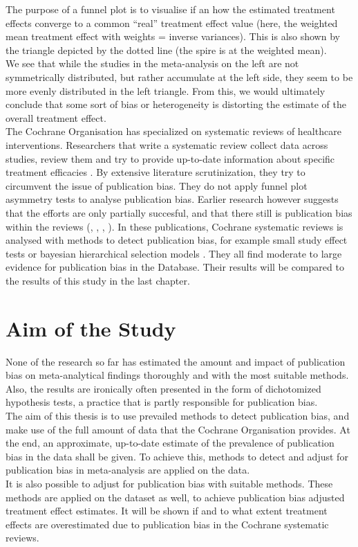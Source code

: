 \documentclass[11pt,a4paper,twoside]{book}\usepackage[]{graphicx}\usepackage[]{color}
\begin{document}
The purpose of a funnel plot is to visualise if an how the estimated treatment effects converge to a common ``real'' treatment effect value (here, the weighted mean treatment effect with weights = inverse variances). This is also shown by the triangle depicted by the dotted line (the spire is at the weighted mean). \\
We see that while the studies in the meta-analysis on the left are not symmetrically distributed, but rather accumulate at the left side, they seem to be more evenly distributed in the left triangle. From this, we would ultimately conclude that some sort of bias or heterogeneity is distorting the estimate of the overall treatment effect.\\
The Cochrane Organisation has specialized on systematic reviews of healthcare interventions. Researchers that write a systematic review collect data across studies, review them and try to provide up-to-date information about specific treatment efficacies \citep{cochrane.handbook}. By extensive literature scrutinization, they try to circumvent the issue of publication bias. They do not apply funnel plot asymmetry tests to analyse publication bias. Earlier research however suggests that the efforts are only partially succesful, and that there still is publication bias within the reviews (\citet{Egger}, \citet{Ioannidis2007}, \citet{kicinsky}, \citet{vanAert.2019}). In these publications, Cochrane systematic reviews is analysed with methods to detect publication bias, for example small study effect tests or bayesian hierarchical selection models \citep{kicinsky}. They all find moderate to large evidence for publication bias in the Database. Their results will be compared to the results of this study in the last chapter.\\

\section{Aim of the Study}
None of the research so far has estimated the amount and impact of publication bias on meta-analytical findings thoroughly and with the most suitable methods. Also, the results are ironically often presented in the form of dichotomized hypothesis tests, a practice that is partly responsible for publication bias.\\
The aim of this thesis is to use prevailed methods to detect publication bias, and make use of the full amount of data that the Cochrane Organisation provides. At the end, an approximate, up-to-date estimate of the prevalence of publication bias in the data shall be given. To achieve this, methods to detect and adjust for publication bias in meta-analysis are applied on the data. \\
It is also possible to adjust for publication bias with suitable methods. These methods are applied on the dataset as well, to achieve publication bias adjusted treatment effect estimates. It will be shown if and to what extent treatment effects are overestimated due to publication bias in the Cochrane systematic reviews.
\end{document}
